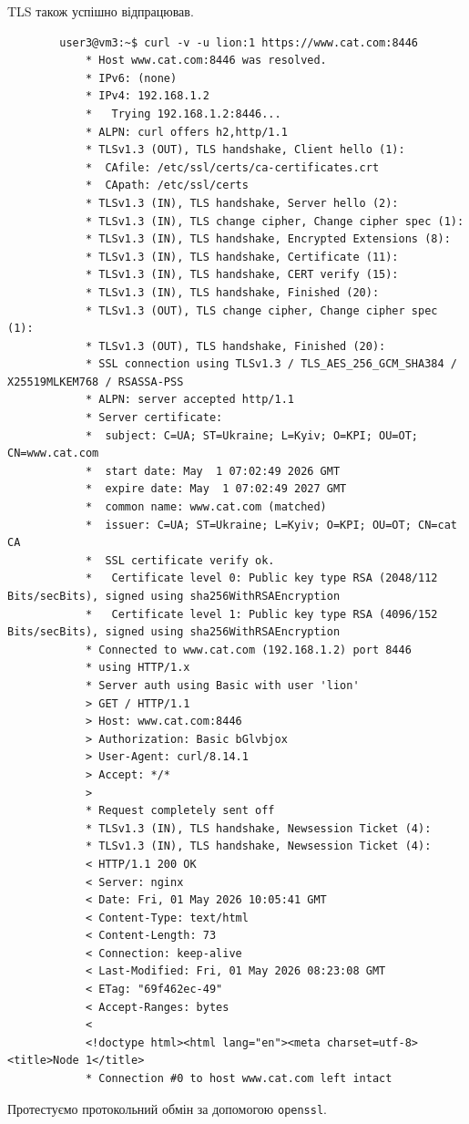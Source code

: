 \documentclass[14pt, a4paper]{extreport}
\begin{document}
	TLS також успішно відпрацював.
	
	\begin{verbatim}
		user3@vm3:~$ curl -v -u lion:1 https://www.cat.com:8446
			* Host www.cat.com:8446 was resolved.
			* IPv6: (none)
			* IPv4: 192.168.1.2
			*   Trying 192.168.1.2:8446...
			* ALPN: curl offers h2,http/1.1
			* TLSv1.3 (OUT), TLS handshake, Client hello (1):
			*  CAfile: /etc/ssl/certs/ca-certificates.crt
			*  CApath: /etc/ssl/certs
			* TLSv1.3 (IN), TLS handshake, Server hello (2):
			* TLSv1.3 (IN), TLS change cipher, Change cipher spec (1):
			* TLSv1.3 (IN), TLS handshake, Encrypted Extensions (8):
			* TLSv1.3 (IN), TLS handshake, Certificate (11):
			* TLSv1.3 (IN), TLS handshake, CERT verify (15):
			* TLSv1.3 (IN), TLS handshake, Finished (20):
			* TLSv1.3 (OUT), TLS change cipher, Change cipher spec (1):
			* TLSv1.3 (OUT), TLS handshake, Finished (20):
			* SSL connection using TLSv1.3 / TLS_AES_256_GCM_SHA384 / X25519MLKEM768 / RSASSA-PSS
			* ALPN: server accepted http/1.1
			* Server certificate:
			*  subject: C=UA; ST=Ukraine; L=Kyiv; O=KPI; OU=OT; CN=www.cat.com
			*  start date: May  1 07:02:49 2026 GMT
			*  expire date: May  1 07:02:49 2027 GMT
			*  common name: www.cat.com (matched)
			*  issuer: C=UA; ST=Ukraine; L=Kyiv; O=KPI; OU=OT; CN=cat CA
			*  SSL certificate verify ok.
			*   Certificate level 0: Public key type RSA (2048/112 Bits/secBits), signed using sha256WithRSAEncryption
			*   Certificate level 1: Public key type RSA (4096/152 Bits/secBits), signed using sha256WithRSAEncryption
			* Connected to www.cat.com (192.168.1.2) port 8446
			* using HTTP/1.x
			* Server auth using Basic with user 'lion'
			> GET / HTTP/1.1
			> Host: www.cat.com:8446
			> Authorization: Basic bGlvbjox
			> User-Agent: curl/8.14.1
			> Accept: */*
			> 
			* Request completely sent off
			* TLSv1.3 (IN), TLS handshake, Newsession Ticket (4):
			* TLSv1.3 (IN), TLS handshake, Newsession Ticket (4):
			< HTTP/1.1 200 OK
			< Server: nginx
			< Date: Fri, 01 May 2026 10:05:41 GMT
			< Content-Type: text/html
			< Content-Length: 73
			< Connection: keep-alive
			< Last-Modified: Fri, 01 May 2026 08:23:08 GMT
			< ETag: "69f462ec-49"
			< Accept-Ranges: bytes
			< 
			<!doctype html><html lang="en"><meta charset=utf-8><title>Node 1</title>
			* Connection #0 to host www.cat.com left intact
	\end{verbatim}
	
	Протестуємо протокольний обмін за допомогою \texttt{openssl}. \sideat{[VM 3]}
	
\end{document}
